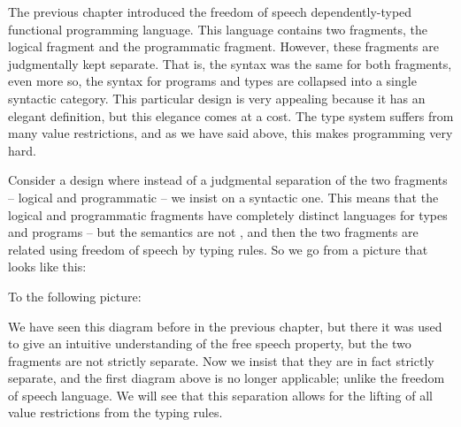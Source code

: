 


\renewcommand{\Sepdrulename}[1]{\scriptsize \textsc{#1}}
\renewcommand{\SepUdrulename}[1]{\scriptsize \textsc{#1}}

The previous chapter introduced the freedom of speech
dependently-typed functional programming language. This language
contains two fragments, the logical fragment and the programmatic
fragment.  However, these fragments are judgmentally kept separate.
That is, the syntax was the same for both fragments, even more so, the
syntax for programs and types are collapsed into a single syntactic
category.  This particular design is very appealing because it has an
elegant definition, but this elegance comes at a cost.  The type
system suffers from many value restrictions, and as we have said
above, this makes programming very hard.

Consider a design where instead of a judgmental separation of the two
fragments -- logical and programmatic -- we insist on a syntactic one.
This means that the logical and programmatic fragments have completely
distinct languages for types and programs -- but the semantics are not
, and then the two fragments
are related using freedom of speech by typing rules.  So we go from a
picture that looks like this:
\begin{center}
\end{center}
To the following picture:
\begin{center}
\end{center}
We have seen this diagram before in the previous chapter, but there it
was used to give an intuitive understanding of the free speech
property, but the two fragments are not strictly separate.  Now we
insist that they are in fact strictly separate, and the first diagram
above is no longer applicable; unlike the freedom of speech language.  We
will see that this separation allows for the lifting of all value
restrictions from the typing rules.  

